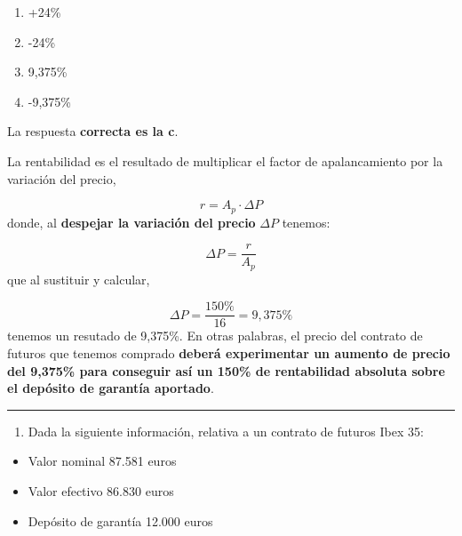 \documentclass[
  letterpaper,
  DIV=11,
  numbers=noendperiod]{scrreprt}
\providecommand{\tightlist}{%
  \setlength{\itemsep}{0pt}\setlength{\parskip}{0pt}}\usepackage{longtable,booktabs,array}
\begin{document}
\begin{enumerate}
\def\labelenumi{\alph{enumi})}
\item
  +24\%
\item
  -24\%
\item
  9,375\%
\item
  -9,375\%
\end{enumerate}

\begin{tcolorbox}[enhanced jigsaw, left=2mm, opacityback=0, colback=white, breakable, arc=.35mm, bottomrule=.15mm, rightrule=.15mm, toprule=.15mm, leftrule=.75mm, colframe=quarto-callout-tip-color-frame]
\begin{minipage}[t]{5.5mm}
\textcolor{quarto-callout-tip-color}{\faLightbulb}
\end{minipage}%
\begin{minipage}[t]{\textwidth - 5.5mm}

La respuesta \textbf{correcta es la c}.

La rentabilidad es el resultado de multiplicar el factor de
apalancamiento por la variación del precio,

\[r=A_p\cdot \Delta P\] donde, al \textbf{despejar la variación del
precio} \(\Delta P\) tenemos:

\[\Delta P=\frac{r}{A_p}\] que al sustituir y calcular,

\[\Delta P=\frac {150\% }{16}  = 9,375\%\] tenemos un resutado de
9,375\%. En otras palabras, el precio del contrato de futuros que
tenemos comprado \textbf{deberá experimentar un aumento de precio del
9,375\% para conseguir así un 150\% de rentabilidad absoluta sobre el
depósito de garantía aportado}.

\end{minipage}%
\end{tcolorbox}

\begin{center}\rule{0.5\linewidth}{0.5pt}\end{center}

\begin{enumerate}
\def\labelenumi{\arabic{enumi}.}
\setcounter{enumi}{68}
\tightlist
\item
  Dada la siguiente información, relativa a un contrato de futuros Ibex
  35:
\end{enumerate}

\begin{itemize}
\item
  Valor nominal 87.581 euros
\item
  Valor efectivo 86.830 euros
\item
  Depósito de garantía 12.000 euros
\end{itemize}
\end{document}
